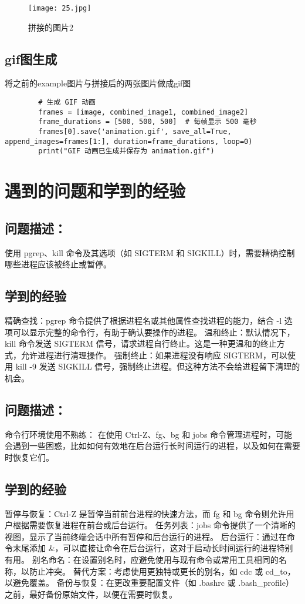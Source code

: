 \documentclass[a4paper, 12pt]{article}
\begin{document}
    \begin{figure}[H]
  \centering
    \texttt{[image: 25.jpg]}
  \caption{拼接的图片2}
   \end{figure}  


   \subsection{gif图生成}
将之前的example图片与拼接后的两张图片做成gif图
\begin{verbatim}
        # 生成 GIF 动画
        frames = [image, combined_image1, combined_image2]
        frame_durations = [500, 500, 500]  # 每帧显示 500 毫秒
        frames[0].save('animation.gif', save_all=True, append_images=frames[1:], duration=frame_durations, loop=0)
        print("GIF 动画已生成并保存为 animation.gif")
\end{verbatim}

 \section{遇到的问题和学到的经验}

\subsection{问题描述：}
使用 pgrep、kill 命令及其选项（如 SIGTERM 和 SIGKILL）时，需要精确控制哪些进程应该被终止或暂停。
  \subsection{学到的经验}
精确查找：pgrep 命令提供了根据进程名或其他属性查找进程的能力，结合 -l 选项可以显示完整的命令行，有助于确认要操作的进程。
温和终止：默认情况下，kill 命令发送 SIGTERM 信号，请求进程自行终止。这是一种更温和的终止方式，允许进程进行清理操作。
强制终止：如果进程没有响应 SIGTERM，可以使用 kill -9 发送 SIGKILL 信号，强制终止进程。但这种方法不会给进程留下清理的机会。
 \subsection{问题描述：}
命令行环境使用不熟练：
在使用 Ctrl-Z、fg、bg 和 jobs 命令管理进程时，可能会遇到一些困惑，比如如何有效地在后台运行长时间运行的进程，以及如何在需要时恢复它们。
  \subsection{学到的经验}
暂停与恢复：Ctrl-Z 是暂停当前前台进程的快速方法，而 fg 和 bg 命令则允许用户根据需要恢复进程在前台或后台运行。
任务列表：jobs 命令提供了一个清晰的视图，显示了当前终端会话中所有暂停和后台运行的进程。
后台运行：通过在命令末尾添加 \&，可以直接让命令在后台运行，这对于启动长时间运行的进程特别有用。
别名命名：在设置别名时，应避免使用与现有命令或常用工具相同的名称，以防止冲突。
替代方案：考虑使用更独特或更长的别名，如 cdc 或 cd\_to，以避免覆盖。
备份与恢复：在更改重要配置文件（如 .bashrc 或 .bash\_profile）之前，最好备份原始文件，以便在需要时恢复。
\end{document}
